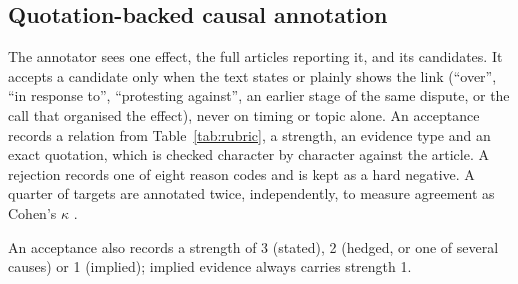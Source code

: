 \documentclass[pdflatex,sn-basic,lineno]{sn-jnl}
\theoremstyle{thmstylethree}
\theoremstyle{thmstyleone}
\begin{document}
\subsection{Quotation-backed causal annotation}
The annotator sees one effect, the full articles reporting it, and its candidates. It accepts a
candidate only when the text states or plainly shows the link (``over'', ``in response to'',
``protesting against'', an earlier stage of the same dispute, or the call that organised the
effect), never on timing or topic alone. An acceptance records a relation from
Table~\ref{tab:rubric}, a strength, an evidence type and an exact quotation, which is checked
character by character against the article. A rejection records one of eight reason codes and is
kept as a hard negative. A quarter of targets are annotated twice, independently, to measure
agreement as Cohen's $\kappa$ \citep{cohen}.

An acceptance also records a strength of 3 (stated), 2 (hedged, or one of several causes) or 1
(implied); implied evidence always carries strength 1.
\end{document}
